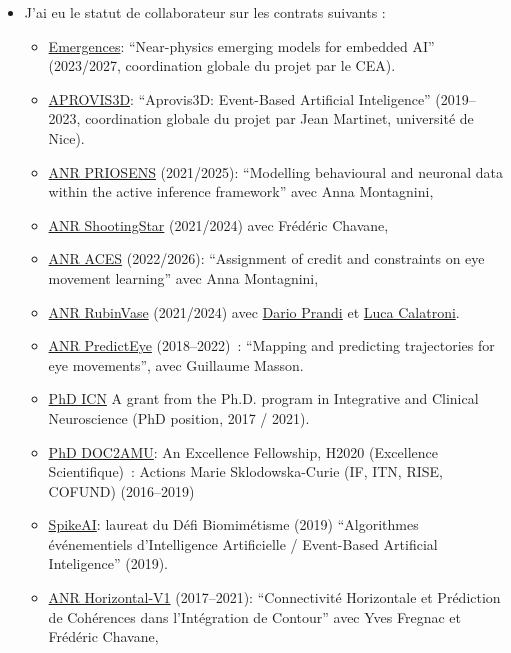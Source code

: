 \documentclass[10pt,french,a4paper,oneside]{article}%
\begin{document}
\begin{itemize}
\item J'ai eu le statut de collaborateur sur les contrats suivants :
\begin{itemize}
	\item  \href{https://laurentperrinet.github.io/grant/emergences/}{Emergences}: ``Near-physics emerging models for embedded AI'' (2023/2027, coordination globale du projet par le CEA).
	\item  \href{https://laurentperrinet.github.io/grant/aprovis-3-d/}{APROVIS3D}: ``Aprovis3D: Event-Based Artificial Inteligence'' (2019--2023, coordination globale du projet par Jean Martinet, université de Nice).
 	\item \href{https://laurentperrinet.github.io/grant/anr-priosens/}{ANR PRIOSENS} (2021/2025): ``Modelling behavioural and neuronal data within the active inference framework'' avec Anna Montagnini,
 	 \item \href{https://laurentperrinet.github.io/grant/anr-shootingstar/}{ANR ShootingStar} (2021/2024) avec Frédéric Chavane,
	  \item \href{https://laurentperrinet.github.io/grant/anr-aces/}{ANR ACES} (2022/2026): ``Assignment of credit and constraints on eye movement learning'' avec Anna Montagnini,
	  \item \href{https://laurentperrinet.github.io/grant/anr-rubinvase/}{ANR RubinVase} (2021/2024) avec \href{https://scholar.google.com/citations?user=22p8Wc4AAAAJ}{Dario Prandi} et \href{https://scholar.google.com/citations?user=dRVPKmkAAAAJ}{Luca Calatroni}.
	  \item \href{https://laurentperrinet.github.io/grant/anr-predicteye/}{ANR PredictEye} (2018--2022)~: ``Mapping and predicting trajectories for eye movements'', avec Guillaume Masson.
	\item \href{https://laurentperrinet.github.io/grant/phd-icn/}{PhD ICN} A grant from the Ph.D. program in Integrative and Clinical Neuroscience (PhD position, 2017 / 2021).
	\item  \href{https://laurentperrinet.github.io/grant/doc-2-amu/}{PhD DOC2AMU}: An Excellence Fellowship, H2020 (Excellence Scientifique)~: Actions Marie Sklodowska-Curie (IF, ITN, RISE, COFUND) (2016--2019)
	\item  \href{https://laurentperrinet.github.io/grant/spikeai/}{SpikeAI}: laureat du Défi Biomimétisme (2019) ``Algorithmes événementiels d'Intelligence Artificielle / Event-Based Artificial Inteligence'' (2019).
	 \item \href{https://laurentperrinet.github.io/grant/anr-horizontal-v1/}{ANR Horizontal-V1} (2017--2021): ``Connectivité Horizontale et Prédiction de Cohérences dans l'Intégration de Contour'' avec Yves Fregnac et Frédéric Chavane,

\end{itemize}
\end{itemize}
\end{document}
